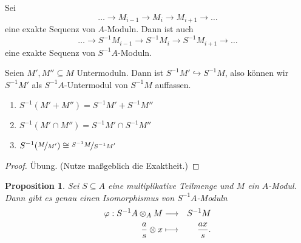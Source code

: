 \documentclass[12pt,a4paper]{scrartcl}
\theoremstyle{cplain}
\newtheorem{prop}[thmcounter]{Proposition}
\theoremstyle{cdef}
\begin{document}
\begin{kor} \label{kor:lokalisation erhaelt exaktheit}
	Sei \[\ldots\to M_{i-1}\to M_i\to M_{i+1}\to\ldots\] eine exakte Sequenz von $A$-Moduln. Dann ist auch 
	\[\ldots \to S^{-1}M_{i-1}\to S^{-1}M_i\to S^{-1}M_{i+1}\to \ldots\]
	eine exakte Sequenz von $S^{-1}A$-Moduln.
\end{kor}
\begin{kor}
	Seien $M',M''\subseteq M$ Untermoduln. Dann ist $S^{-1}M'\hookrightarrow S^{-1}M$, also können wir $S^{-1}M'$ als $S^{-1}A$-Untermodul von $S^{-1}M$ auffassen.
	\begin{enumerate}
		\item $S^{-1}(M'+M'') = S^{-1}M'+S^{-1}M''$
		\item $S^{-1}(M'\cap M'') = S^{-1}M'\cap S^{-1}M''$
		\item $S^{-1}(\nicefrac{M}{M'}) \cong \nicefrac{S^{-1}M}{S^{-1}M'}$
	\end{enumerate}
\end{kor}
\begin{proof} Übung. (Nutze maßgeblich die Exaktheit.)
\end{proof}
\begin{prop} \label{prop:5.8}
	Sei $S\subseteq A$ eine multiplikative Teilmenge und $M$ ein $A$-Modul. Dann gibt es genau einen Isomorphismus von $S^{-1}A$-Moduln
	\begin{eqnarray*}
		\varphi: S^{-1}A\otimes_AM &\longrightarrow& S^{-1}M \\
		\frac as \otimes x &\longmapsto& \frac{ax}s.
	\end{eqnarray*}
\end{prop}
\end{document}
